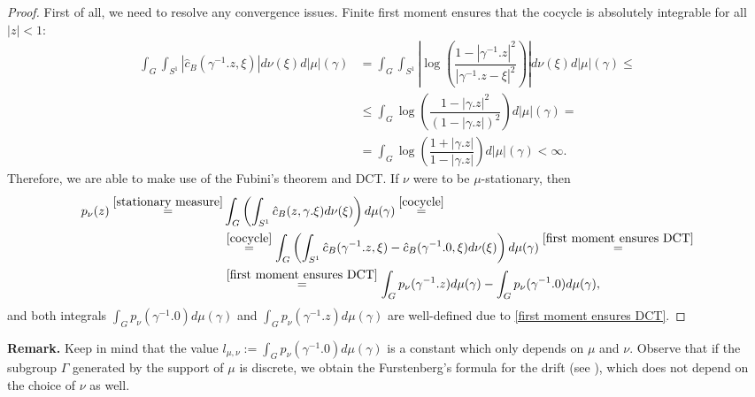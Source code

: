 \documentclass[11pt]{article}
\begin{document}
\begin{proof}
	First of all, we need to resolve any convergence issues. Finite first moment ensures that the cocycle is absolutely integrable for all $|z| < 1$:
	\begin{equation}
		\label{first moment ensures DCT}
		\begin{aligned}
			\int_G \int_{S^1} |\hat{c}_B(\gamma^{-1}.z, \xi)| d\nu(\xi) d |\mu|(\gamma)  &= \int_G \int_{S^1} \left|  \log \left( \dfrac{1 - |\gamma^{-1}.z|^2}{|\gamma^{-1}.z - \xi|^2} \right) \right| d\nu(\xi)  d |\mu|(\gamma)  \le \\ 
			&\le \int_G   \log \left( \dfrac{1 - |\gamma.z|^2}{(1-|\gamma.z|)^2} \right) d|\mu|(\gamma) = \\ 
			&= \int_G  \log \left( \dfrac{1 + |\gamma.z|}{1-|\gamma.z|} \right) d|\mu|(\gamma) < \infty.
		\end{aligned}	
	\end{equation}
	Therefore, we are able to make use of the Fubini's theorem and DCT. If $\nu$ were to be $\mu$-stationary, then
	\[
	\begin{aligned}
		p_\nu(z) \stackrel{\eqref{stationary measure}}{=} & \int_{G} \left( \int_{S^1} \hat{c}_B(z, \gamma.\xi) d \nu(\xi) \right)  d \mu(\gamma) \stackrel{\eqref{cocycle}}{=} \\ 
		&\stackrel{\eqref{cocycle}}{=} \int_{G} \left( \int_{S^1} \hat{c}_B(\gamma^{-1}.z, \xi) - \hat{c}_B(\gamma^{-1}.0,\xi)  d \nu(\xi) \right)  d \mu(\gamma)  \stackrel{\eqref{first moment ensures DCT}}{=} \\
		&\stackrel{\eqref{first moment ensures DCT}}{=}  \int_{G} p_\nu(\gamma^{-1}.z) d \mu(\gamma)  - \int_{G}p_\nu(\gamma^{-1}.0)  d \mu(\gamma),
	\end{aligned}
	\]
	and both integrals $\int_{G}p_\nu(\gamma^{-1}.0)  d \mu(\gamma)$ and $\int_{G}p_\nu(\gamma^{-1}.z)  d \mu(\gamma)$ are well-defined due to \eqref{first moment ensures DCT}.
\end{proof}

\textbf{Remark.} Keep in mind that the value $l_{\mu, \nu} := \int_{G}p_\nu(\gamma^{-1}.0)  d \mu(\gamma)$ is a constant which only depends on $\mu$ and $\nu$. Observe that if the subgroup $\Gamma$ generated by the support of $\mu$ is discrete, we obtain the Furstenberg's formula for the drift (see \cite{furstenberg1963noncommuting}), which does not depend on the choice of $\nu$ as well.
\end{document}
